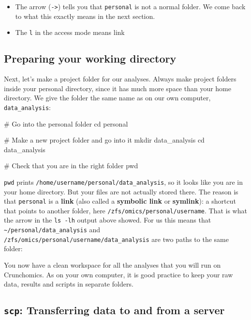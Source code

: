 \documentclass[
  letterpaper,
  DIV=11,
  numbers=noendperiod]{scrreprt}
\newenvironment{Shaded}{}{}
\newcommand{\BuiltInTok}[1]{\textcolor[rgb]{0.84,0.23,0.29}{#1}}
\newcommand{\CommentTok}[1]{\textcolor[rgb]{0.42,0.45,0.49}{#1}}
\newcommand{\FunctionTok}[1]{\textcolor[rgb]{0.44,0.26,0.76}{#1}}
\newcommand{\NormalTok}[1]{\textcolor[rgb]{0.14,0.16,0.18}{#1}}
\providecommand{\tightlist}{%
  \setlength{\itemsep}{0pt}\setlength{\parskip}{0pt}}
\begin{document}
\begin{itemize}
\tightlist
\item
  The arrow (\texttt{-\textgreater{}}) tells you that \texttt{personal}
  is not a normal folder. We come back to what this exactly means in the
  next section.
\item
  The \texttt{l} in the access mode means link
\end{itemize}

\subsection{Preparing your working
directory}\label{preparing-your-working-directory}

Next, let's make a project folder for our analyses. Always make project
folders inside your personal directory, since it has much more space
than your home directory. We give the folder the same name as on our own
computer, \texttt{data\_analysis}:

\begin{Shaded}
\begin{Highlighting}[]
\CommentTok{\# Go into the personal folder}
\BuiltInTok{cd}\NormalTok{ personal}

\CommentTok{\# Make a new project folder and go into it}
\FunctionTok{mkdir}\NormalTok{ data\_analysis}
\BuiltInTok{cd}\NormalTok{ data\_analysis}

\CommentTok{\# Check that you are in the right folder}
\BuiltInTok{pwd}
\end{Highlighting}
\end{Shaded}

\texttt{pwd} prints \texttt{/home/username/personal/data\_analysis}, so
it looks like you are in your home directory. But your files are not
actually stored there. The reason is that \texttt{personal} is a
\textbf{link} (also called a \textbf{symbolic link} or
\textbf{symlink}): a shortcut that points to another folder, here
\texttt{/zfs/omics/personal/username}. That is what the arrow in the
\texttt{ls\ -lh} output above showed. For us this means that
\texttt{\textasciitilde{}/personal/data\_analysis} and
\texttt{/zfs/omics/personal/username/data\_analysis} are two paths to
the same folder:

You now have a clean workspace for all the analyses that you will run on
Crunchomics. As on your own computer, it is good practice to keep your
raw data, results and scripts in separate folders.

\subsection{\texorpdfstring{\texttt{scp}: Transferring data to and from
a
server}{scp: Transferring data to and from a server}}\label{scp-transferring-data-to-and-from-a-server}
\end{document}
